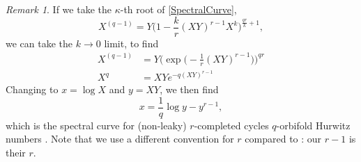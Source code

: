\documentclass[10pt,a4paper,oneside,no-math,reqno]{amsart}%
\theoremstyle{plain}
\theoremstyle{definition}
\theoremstyle{remark}
\newtheorem{remark}[theorem]{Remark}
\numberwithin{equation}{section}
\newcommand{\1}{\mathds{1}}
\newcommand{\<}{\langle}
\renewcommand{\>}{\rangle}
\begin{document}
\begin{remark}
    If we take the $ \kappa$-th root of \cref{SpectralCurve},
    \begin{equation}
		X^{(q-1)}
        =
        Y \big( 1 - \frac{k}{r} (XY)^{r-1} X^{k} \big)^{\frac{qr}{k} + 1} ,
	\end{equation}
    we can take the $ k \to 0$ limit, to find
    \begin{align}
		X^{(q-1)} 
        &= 
        Y \Big( \exp \big( - \frac{1}{r} (XY)^{r-1} \big) \Big)^{qr }
        \\
        X^q 
        &= 
        XY e^{ - q (XY)^{r-1} }
	\end{align}
    Changing to $ x = \log X$ and $ y = XY$, we then find
    \begin{equation}
        x
        =
        \frac{1}{q} \log y - y^{r-1},
    \end{equation}
    which is the spectral curve for (non-leaky) $ r$-completed cycles $q$-orbifold Hurwitz numbers \cite{DKPS23}. Note that we use a different convention for $r$ compared to \cite{DKPS23}: our $ r-1$ is their $ r$.
\end{remark}
\end{document}
